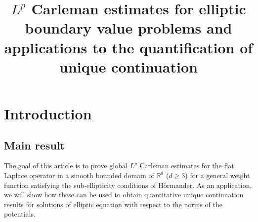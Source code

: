 \documentclass[AHL,Unicode,longabstracts]{cedram}
\title[Global $L^p$ Carleman estimates for the Laplace operator]{$L^p$ Carleman estimates for elliptic boundary value problems and applications to the quantification of unique continuation}
\author[\initial{B.} \lastname{Dehman}]{\firstname{Belhassen} \lastname{Dehman}}
\author[\initial{S.} \lastname{Ervedoza}]{\firstname{Sylvain} \lastname{Ervedoza}}
\author[\initial{L.} \lastname{Thabouti}]{\firstname{Lotfi} \lastname{Thabouti}}
\newcommand*\R{\mathbb{R}}
\renewcommand{\geq}{\geqslant}
\begin{document}
\maketitle

\section{Introduction}

\subsection*{Main result}
The goal of this article is to prove global $L^p$ Carleman estimates for the flat Laplace operator in a smooth bounded domain of $\R^d$ ($d \geq 3$) for a general weight function satisfying the sub-ellipticity conditions of Hörmander. As an application, we will show how these can be used to obtain quantitative unique continuation results for solutions of elliptic equation with respect to the norms of the potentials.
\end{document}
